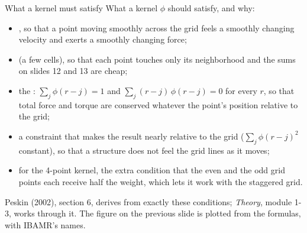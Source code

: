 \documentclass[aspectratio=169,11pt]{beamer}
\begin{document}
\begin{frame}{What a kernel must satisfy}
\small What a kernel $\phi$ should satisfy, and why:
\begin{itemize}
  \item {}, so that a point moving smoothly across the grid feels a smoothly changing velocity and exerts a smoothly changing force;
  \item {} (a few cells), so that each point touches only its neighborhood and the sums on slides 12 and 13 are cheap;
  \item the : $\sum_j \phi(r - j) = 1$ and $\sum_j (r-j)\,\phi(r-j) = 0$ for every $r$, so that total force and torque are conserved whatever the point's position relative to the grid;
  \item a constraint that makes the result nearly  relative to the grid ($\sum_j \phi(r-j)^2$ constant), so that a structure does not feel the grid lines as it moves;
  \item for the 4-point kernel, the extra condition that the even and the odd grid points each receive half the weight, which lets it work with the staggered grid.
\end{itemize}
\vspace{2mm}
\begin{punchbox}
\small Peskin (2002), section 6, derives  from exactly these conditions; \emph{Theory}, module 1-3, works through it. The figure on the previous slide is plotted from the formulas, with IBAMR's names.
\end{punchbox}
\end{frame}
\end{document}
